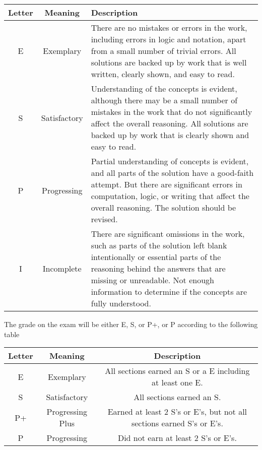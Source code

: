 \documentclass[12pt]{amsart}
\theoremstyle{definition}
\begin{document}
\begin{center}
\begin{tabular}{|c|c|p{4in}|}
\hline
Letter &Meaning &Description\\
\hline
E &Exemplary &There are no mistakes or errors in the work, including errors in logic and notation, apart from a small number of trivial errors. All solutions are backed up by work that is well written, clearly shown, and easy to read.\\
\hline
S &Satisfactory &Understanding of the concepts is evident, although there may be a small number of mistakes in the work that do not significantly affect the overall reasoning. All solutions are backed up by work that is clearly shown and easy to read.\\
\hline
P &Progressing &Partial understanding of concepts is evident, and all parts of the solution have a good-faith attempt. But there are significant errors in computation, logic, or writing that affect the overall reasoning. The solution should be revised.\\
\hline
I &Incomplete &There are significant omissions in the work, such as parts of the solution left blank intentionally or essential parts of the reasoning behind the answers that are missing or unreadable. Not enough information to determine if the concepts are fully understood. \\
\hline
\end{tabular}
\end{center}
\hspace{.5in}

The grade on the exam will be either E, S, or P+, or P according to the following table 

\begin{center}
\begin{tabular}{|c|c|c|}
\hline
Letter &Meaning &Description\\
\hline
E &Exemplary &All sections earned an S or a E including at least one E. \\
\hline
S &Satisfactory &All sections earned an S.\\
\hline
P+ &Progressing Plus &Earned at least 2 S's or E's, but not all sections earned S's or E's.\\
\hline
P &Progressing &Did not earn at least 2 S's or E's.\\
\hline
\end{tabular}
\end{center}

\newpage
\end{document}
